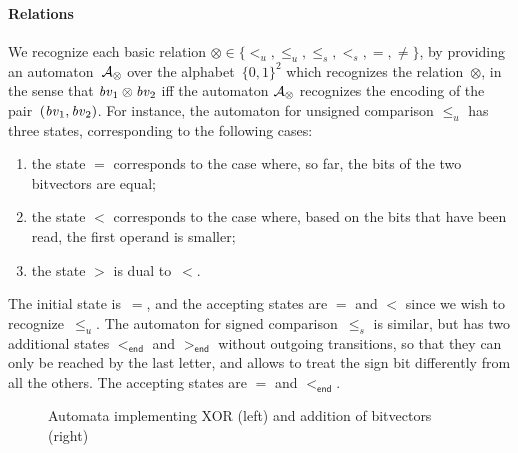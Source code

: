 \paragraph{Relations}
We recognize each basic relation $\otimes \in \{<_u, \leq_u, \leq_s, <_s,
=, \neq \}$, by providing an automaton~$\mathcal{A}_\otimes$ over the
  alphabet~$\{0,1\}^2$ which recognizes the relation~$\otimes$, in the sense
  that $\mathit{bv}_1 \otimes \mathit{bv}_2$ iff the automaton $\mathcal{A}_\otimes$ recognizes the encoding
  of the pair~$(\mathit{bv}_1, \mathit{bv}_2)$.
%
For instance, the automaton for unsigned comparison $\leq_u$ has three states,
corresponding to the following cases:
\begin{enumerate}
\item the state $=$ corresponds to the case where, so far, the bits of the two
  bitvectors are equal;
\item the state $<$ corresponds to the case where, based on the bits that have
  been read, the first operand is smaller;
\item the state $>$ is dual to~$<$.
\end{enumerate}
%
The initial state is~$=$, and the accepting states are $=$ and $<$ since we
wish to recognize~$\leq_u$.
%
The automaton for signed comparison~$\leq_s$ is similar, but has two additional
states $<_\textsf{end}$ and $>_\textsf{end}$ without outgoing transitions, so
that they can only be reached by the last letter, and allows to treat the
sign bit differently from all the others. The accepting states are $=$ and
$<_\textsf{end}$.

\begin{figure}
  \usetikzlibrary {arrows.meta,automata,positioning}
  \caption{Automata implementing XOR (left) and addition of bitvectors (right)}
  \label{fig:swbv:addition-nfa}
\end{figure}


